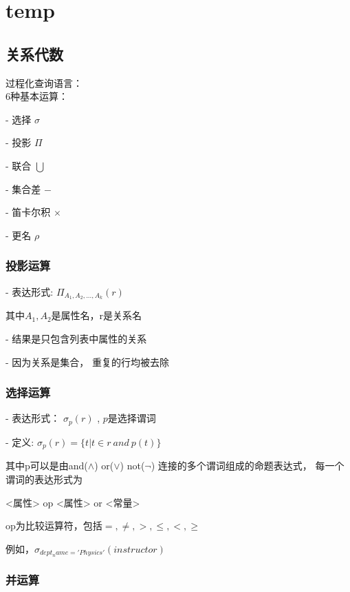 \documentclass{article}        %
\begin{document}
 
\section{temp }

\subsection{关系代数}

过程化查询语言：\\ 

6种基本运算：

- 选择 $\sigma$ 

- 投影 $\Pi$

- 联合 $\bigcup$

- 集合差 $-$ 

- 笛卡尔积 $\times $

- 更名 $\rho$

\subsubsection{投影运算}

- 表达形式: $\Pi_{A_1,A_2,...,A_k}(r) $ 

其中$A_1,A_2$是属性名，r是关系名 

- 结果是只包含列表中属性的关系 

- 因为关系是集合， 重复的行均被去除 

\subsubsection{选择运算}

- 表达形式：
$ \sigma_p (r) $ ,
$p$是选择谓词 

- 定义:
$ \sigma_p (r) = \{t | t \in r \ and \  p(t) \} $

其中p可以是由and($\wedge$) or($\vee$) not($\neg$) 连接的多个谓词组成的命题表达式，
每一个谓词的表达形式为

<属性> op <属性> or <常量> 

op为比较运算符，包括$=, \neq, >, \le, <, \ge $

例如，$\sigma_{dept_name='Physics'}(instructor) $

\subsubsection{并运算}
\end{document}
